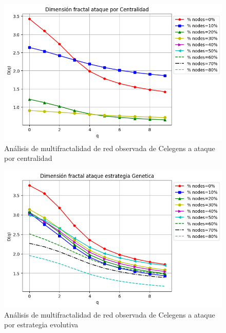 \begin{figure}[H]
    \centering
    \includegraphics[scale=0.7]{Capitulo6MultifractalidadYRobustez/imagenes/grafica_DqCentrality20180508_020345Celengs.png}
    \caption{Análisis de multifractalidad de red observada de Celegens a ataque por centralidad}
\end{figure}


\begin{figure}[H]
    \centering
    \includegraphics[scale=0.7]{Capitulo6MultifractalidadYRobustez/imagenes/grafica_DqGenetic20180508_020345Celengs.png}
    \caption{Análisis de multifractalidad de red observada de Celegens a ataque por estrategia evolutiva}
\end{figure}


